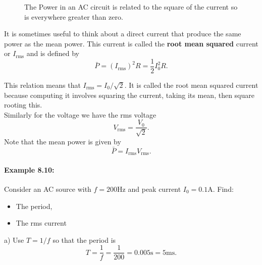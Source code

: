 \begin{figure}[ht]
    \centering
    \caption{The Power in an AC circuit is related to the square of the current so is everywhere greater than zero.}
        \label{fig: AC Power}
\end{figure}

It is sometimes useful to think about a direct current that produce the same power as the mean power. This current is called the \textbf{root mean squared} current or $I_{\text{rms}}$ and is defined by 
\begin{equation*}
\bar{P}=(I_{\text{rms}})^{2}R=\frac{1}{2}I_{0}^{2}R.
\end{equation*}

This relation means that $I_{\text{rms}}=I_{0}/\sqrt{2}$. It is called the root mean squared current because computing it involves squaring the current, taking its mean, then square rooting this.\\

Similarly for the voltage we have the rms voltage
\begin{equation*}
V_{\text{rms}}=\frac{V_{0}}{\sqrt{2}}.
\end{equation*}
Note that the mean power is given by
\begin{equation*}
\bar{P}=I_{\text{rms}}V_{\text{rms}}.
\end{equation*}

\paragraph{Example 8.10:} Consider an AC source with $f=200\text{Hz}$ and peak current $I_{0}=0.1\text{A}$. Find:
\begin{itemize}
\setlength{\itemsep}{-5pt}
    \item[a)] The period,
    \item[b)] The rms current
\end{itemize}  

a) Use $T=1/f$ so that the period is
\begin{equation*}
T=\frac{1}{f}=\frac{1}{200}=0.005\text{s}=5\text{ms}.
\end{equation*}

